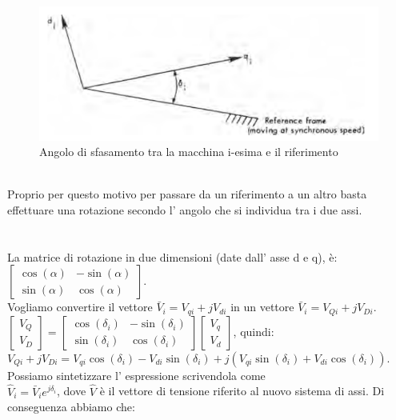 \documentclass[Lau,noexaminfo]{sapthesis}
\begin{document}
	\begin{figure}
		\centering
		\includegraphics[height=0.2\textheight]{riferimento_comune}
		\caption{Angolo di sfasamento tra la macchina i-esima e il riferimento}
	\end{figure}\\
	Proprio per questo motivo per passare da un riferimento a un altro basta effettuare una rotazione secondo l' angolo che si individua tra i due assi.
	\\\\\\
	La matrice di rotazione in due dimensioni (date dall' asse d e q), è:\\
	$\begin{bmatrix}
	\cos(\alpha) & -\sin(\alpha)\\
	\sin(\alpha) & \cos(\alpha)
	\end{bmatrix}$. \\
	Vogliamo convertire il vettore $\bar{V}_{i}=V_{qi}+jV_{di}$ in un vettore $\bar{V}_{i}=V_{Qi}+jV_{Di}$.\\
	$\begin{bmatrix}
	V_Q\\
	V_D
	\end{bmatrix}=
	\begin{bmatrix}
	\cos(\delta_i) & -\sin(\delta_i)\\
	\sin(\delta_i) & \cos(\delta_i)
	\end{bmatrix}
	\begin{bmatrix}
	V_q\\
	V_d
	\end{bmatrix}$, quindi:\\
	$V_{Qi}+jV_{Di}=V_{qi}\cos(\delta_i)-V_{di}\sin(\delta_i) +j(V_{qi}\sin(\delta_i)+V_{di}\cos(\delta_i))$.\\
	Possiamo sintetizzare l' espressione scrivendola come\\
	$\hat{V}_i=\bar{V}_ie^{j\delta_i}$, dove $\hat{V}$ è il vettore di tensione riferito al nuovo sistema di assi. Di conseguenza abbiamo che:\\
\end{document}
